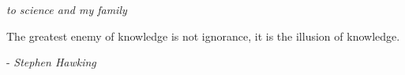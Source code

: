 \thispagestyle{plain}
\mbox{}
\vspace{2in}
\begin{center}
{\em to science and my family}
\end{center}
\vspace{2in}
\begin{center}
	{The greatest enemy of knowledge is not ignorance, it is the illusion of knowledge.}
\end{center}
\begin{flushright}
	- \textit{Stephen Hawking}
\end{flushright}
